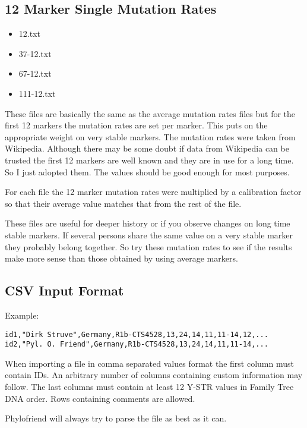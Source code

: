 \subsection*{12 Marker Single Mutation Rates}

\begin{itemize}
\item 12.txt
\item 37-12.txt
\item 67-12.txt
\item 111-12.txt
\end{itemize}

These files are basically the same as the average mutation
rates files but for the first 12 markers the mutation rates
are set per marker. This puts on the appropriate weight on
very stable markers. The mutation rates were taken from
Wikipedia\cite{Wiki-List_of_DYS_markers}. Although there
may be some doubt if data from Wikipedia can be trusted 
the first 12 markers are well known and they are in use
for a long time. So I just adopted them. The values should be
good enough for most purposes.

For each file the 12 marker mutation rates were multiplied
by a calibration factor so that their average value matches
that from the rest of the file.

These files are useful for deeper history or if you
observe changes on long time stable markers. If several
persons share the same value on a very stable marker they
probably belong together. So try these mutation rates to
see if the results make more sense than those obtained by
using average markers.


\subsection{CSV Input Format}

Example:

\begin{verbatim}
id1,"Dirk Struve",Germany,R1b-CTS4528,13,24,14,11,11-14,12,...
id2,"Pyl. O. Friend",Germany,R1b-CTS4528,13,24,14,11,11-14,...
\end{verbatim}

When importing a file in comma separated values format the
first column must contain IDs. An arbitrary number of columns
containing custom information may follow. The last columns
must contain at least 12 Y-STR values in Family Tree DNA order.
Rows containing comments are allowed.

Phylofriend will always try to parse the file as best as
it can.


